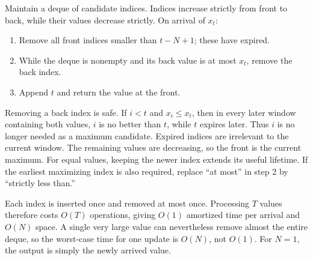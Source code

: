 Maintain a deque of candidate indices. Indices increase strictly from front to back, while their values decrease strictly. On arrival of $x_t$:
\begin{enumerate}
\item Remove all front indices smaller than $t-N+1$; these have expired.
\item While the deque is nonempty and its back value is at most $x_t$, remove the back index.
\item Append $t$ and return the value at the front.
\end{enumerate}
Removing a back index is safe. If $i<t$ and $x_i\le x_t$, then in every later window containing both values, $i$ is no better than $t$, while $t$ expires later. Thus $i$ is no longer needed as a maximum candidate. Expired indices are irrelevant to the current window. The remaining values are decreasing, so the front is the current maximum. For equal values, keeping the newer index extends its useful lifetime. If the earliest maximizing index is also required, replace ``at most'' in step 2 by ``strictly less than.''

Each index is inserted once and removed at most once. Processing $T$ values therefore costs $O(T)$ operations, giving $O(1)$ amortized time per arrival and $O(N)$ space. A single very large value can nevertheless remove almost the entire deque, so the worst-case time for one update is $O(N)$, not $O(1)$. For $N=1$, the output is simply the newly arrived value.
